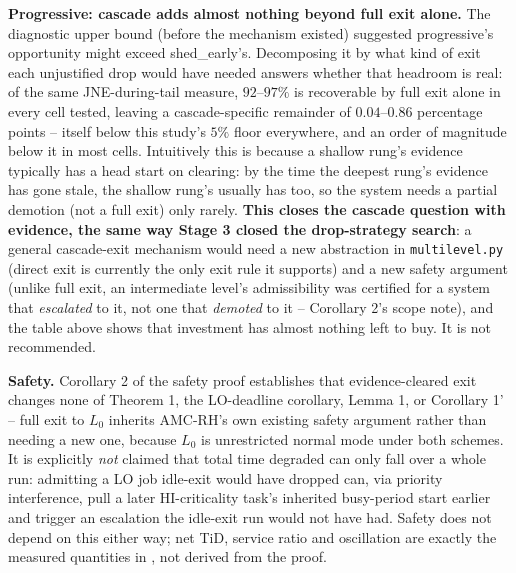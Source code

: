 \textbf{Progressive: cascade adds almost nothing beyond full exit alone.} The
diagnostic upper bound (before the mechanism existed) suggested progressive's
opportunity might exceed shed\_early's. Decomposing it by what kind of exit
each unjustified drop would have needed answers whether that headroom is real:
of the same JNE-during-tail measure, $92$--$97\%$ is recoverable by full exit
alone in every cell tested, leaving a cascade-specific remainder of
$0.04$--$0.86$ percentage points -- itself below this study's $5\%$ floor
everywhere, and an order of magnitude below it in most cells. Intuitively this
is because a shallow rung's evidence typically has a head start on clearing:
by the time the deepest rung's evidence has gone stale, the shallow rung's
usually has too, so the system needs a partial demotion (not a full exit) only
rarely. \textbf{This closes the cascade question with evidence, the same way
Stage 3 closed the drop-strategy search}: a general cascade-exit mechanism
would need a new abstraction in \texttt{multilevel.py} (direct exit is
currently the only exit rule it supports) and a new safety argument (unlike
full exit, an intermediate level's admissibility was certified for a system
that \emph{escalated} to it, not one that \emph{demoted} to it -- Corollary 2's
scope note), and the table above shows that investment has almost nothing left
to buy. It is not recommended.

\textbf{Safety.} Corollary 2 of the safety proof establishes that evidence-cleared
exit changes none of Theorem 1, the LO-deadline corollary, Lemma 1, or
Corollary 1' -- full exit to $L_0$ inherits AMC-RH's own existing safety
argument rather than needing a new one, because $L_0$ is unrestricted normal
mode under both schemes. It is explicitly \emph{not} claimed that total time
degraded can only fall over a whole run: admitting a LO job idle-exit would
have dropped can, via priority interference, pull a later HI-criticality
task's inherited busy-period start earlier and trigger an escalation the
idle-exit run would not have had. Safety does not depend on this either way;
net TiD, service ratio and oscillation are exactly the measured quantities in
, not derived from the proof.

